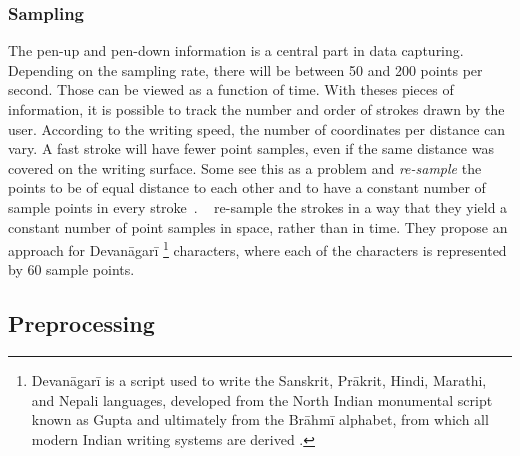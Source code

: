 

\subsubsection{Sampling}
\label{sec:sampling}

The pen-up and pen-down information is a central part in data capturing. 
Depending on the sampling rate, there will be between 50 and 200 points per 
second. Those can be viewed as a function of time.
With theses pieces of information, it is possible to track the number and order
of strokes drawn by the user. According to the writing speed, the number of 
coordinates per distance can vary. A fast stroke will have fewer point samples,
even if the same distance was covered on the writing surface.
Some see this as a problem and \emph{re-sample} the points to be of equal 
distance to each other and to have a constant number of sample points in every 
stroke~.
~\citeyear{Joshi2005} re-sample the strokes in a way that they yield a constant 
number of point samples in space, rather than in time. They propose an approach 
for Devanāgarī
\footnote 
{
Devanāgarī is a script used to write the Sanskrit, Prākrit, Hindi, Marathi, 
and Nepali languages, developed from the North Indian monumental script known 
as Gupta and ultimately from the Brāhmī alphabet, from which all modern Indian 
writing systems are derived \cite{EncyclopediaBritannicaDevanagari}.
} 
characters, where each of the characters is represented by 60 sample points.

\subsection{Preprocessing}
\label{sec:preprocessing}

